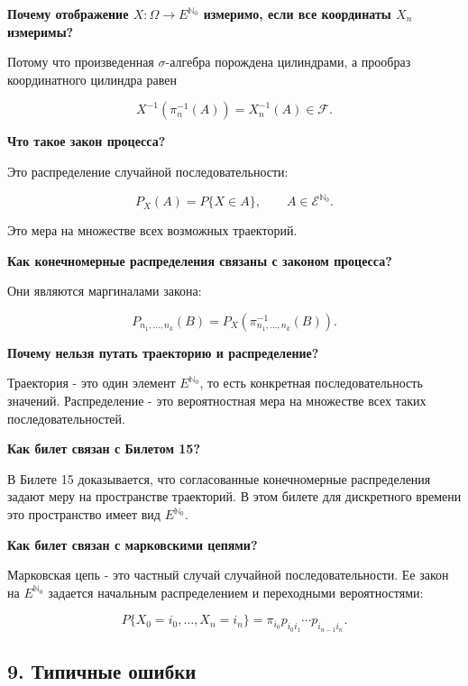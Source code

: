 \documentclass[
  11pt,
  a4paper,
]{article}
\begin{document}
\textbf{Почему отображение \(X:\Omega\to E^{\mathbb N_0}\) измеримо,
если все координаты \(X_n\) измеримы?}

Потому что произведенная \(\sigma\)-алгебра порождена цилиндрами, а
прообраз координатного цилиндра равен

\[
X^{-1}(\pi_n^{-1}(A))=X_n^{-1}(A)\in\mathcal F.
\]

\textbf{Что такое закон процесса?}

Это распределение случайной последовательности:

\[
P_X(A)=P\{X\in A\},
\qquad
A\in\mathcal E^{\mathbb N_0}.
\]

Это мера на множестве всех возможных траекторий.

\textbf{Как конечномерные распределения связаны с законом процесса?}

Они являются маргиналами закона:

\[
P_{n_1,\ldots,n_k}(B)
=
P_X(\pi_{n_1,\ldots,n_k}^{-1}(B)).
\]

\textbf{Почему нельзя путать траекторию и распределение?}

Траектория - это один элемент \(E^{\mathbb N_0}\), то есть конкретная
последовательность значений. Распределение - это вероятностная мера на
множестве всех таких последовательностей.

\textbf{Как билет связан с Билетом 15?}

В Билете 15 доказывается, что согласованные конечномерные распределения
задают меру на пространстве траекторий. В этом билете для дискретного
времени это пространство имеет вид \(E^{\mathbb N_0}\).

\textbf{Как билет связан с марковскими цепями?}

Марковская цепь - это частный случай случайной последовательности. Ее
закон на \(E^{\mathbb N_0}\) задается начальным распределением и
переходными вероятностями:

\[
P\{X_0=i_0,\ldots,X_n=i_n\}
=
\pi_{i_0}p_{i_0i_1}\cdots p_{i_{n-1}i_n}.
\]

\subsection{9. Типичные
ошибки}\label{ux442ux438ux43fux438ux447ux43dux44bux435-ux43eux448ux438ux431ux43aux438}
\end{document}
